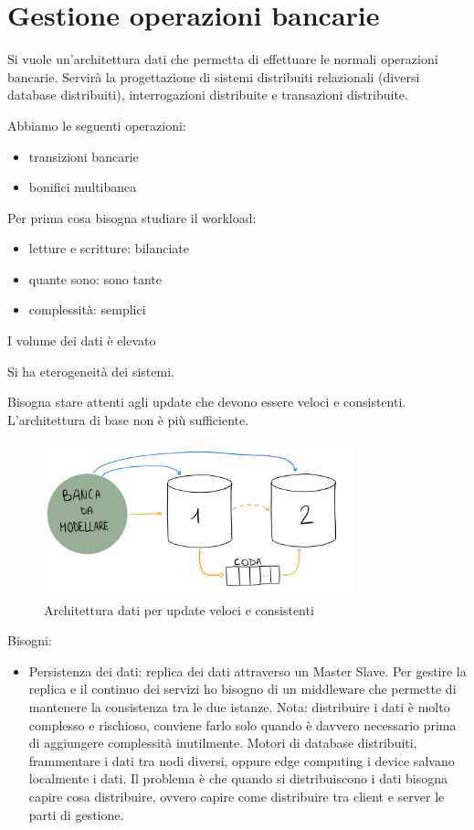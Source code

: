 \section{Gestione operazioni bancarie}
Si vuole un'architettura dati che permetta di effettuare le normali operazioni
bancarie. Servirà la progettazione di sistemi distribuiti relazionali (diversi database distribuiti),
interrogazioni distribuite e transazioni distribuite.

Abbiamo le seguenti operazioni:
\begin{itemize}
    \item transizioni bancarie
    \item bonifici multibanca
\end{itemize}

Per prima cosa bisogna studiare il workload:
\begin{itemize}
    \item letture e scritture: bilanciate
    \item quante sono: sono tante
    \item complessità: semplici
\end{itemize}

I volume dei dati è elevato

Si ha eterogeneità dei sistemi.

Bisogna stare attenti agli update che devono essere veloci e consistenti. L'architettura
di base non è più sufficiente.

\begin{figure}[ht]
      \centering
      \includegraphics[width=0.8\textwidth]{./img/modellazione_banca.jpg}
      \caption{Architettura dati per update veloci e consistenti}
\end{figure}

Bisogni:
\begin{itemize}
    \item Persistenza dei dati: replica dei dati attraverso un Master Slave. Per
          gestire la replica e il continuo dei servizi ho bisogno di un middleware che
          permette di mantenere la consistenza tra le due istanze. Nota: distribuire
          i dati è molto complesso e rischioso, conviene farlo solo quando è davvero
          necessario prima di aggiungere complessità inutilmente. Motori di database
          distribuiti, frammentare i dati tra nodi diversi, oppure edge computing i device
          salvano localmente i dati. Il problema è che quando si distribuiscono i dati
          bisogna capire cosa distribuire, ovvero capire come distribuire tra client e
          server le parti di gestione.
\end{itemize}

